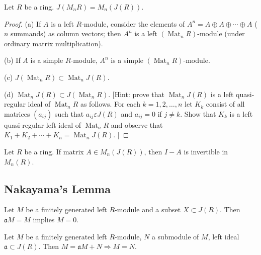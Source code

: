 \begin{proposition}
    Let $R$ be a ring. $J\left(M_n R\right)=M_n \left(J(R)\right)$.
    \begin{proof}
        (a) If $A$ is a left $R$-module, consider the elements of $A^n=A \oplus A \oplus \cdots \oplus A$ ( $n$ summands) as column vectors; then $A^n$ is a left $\left(\operatorname{Mat}_n R\right)$-module (under ordinary matrix multiplication).

        (b) If $A$ is a simple $R$-module, $A^n$ is a simple $\left(\operatorname{Mat}_n R\right)$-module.

        (c) $J\left(\operatorname{Mat}_n R\right) \subset \operatorname{Mat}_n J(R)$.

        (d) $\operatorname{Mat}_n J(R) \subset J\left(\operatorname{Mat}_n R\right)$. [Hint: prove that $\operatorname{Mat}_n J(R)$ is a left quasi-regular ideal of $\operatorname{Mat}_n R$ as follows. For each $k=1,2, \ldots, n$ let $K_k$ consist of all matrices $\left(a_{i j}\right)$ such that $a_{i j} \varepsilon J(R)$ and $a_{i j}=0$ if $j \neq k$. Show that $K_k$ is a left quasi-regular left ideal of $\operatorname{Mat}_n R$ and observe that $K_1+K_2+\cdots+K_n=\operatorname{Mat}_n J(R)$. $]$
    \end{proof}
\end{proposition}


\begin{corollary}
    Let $R$ be a ring. If matrix $A\in M_n\left(J( R)\right)$, then $I-A$ is invertible in $M_n(R)$.
\end{corollary}


\subsection{Nakayama's Lemma} %


\begin{theorem}
    \label{pro: Nakayama's lemma}
    Let $M$ be a finitely generated left $R$-module and a subset $X \subset J(R)$.
    Then $\mathfrak{a} M=M$ implies $M=0$.
\end{theorem}


\begin{corollary}
    Let $M$ be a finitely generated left $R$-module, $N$ a submodule of $M$, left ideal $\mathfrak{a} \subset J(R)$.
    Then $M=\mathfrak{a} M+N \Rightarrow M=N$.
\end{corollary}





